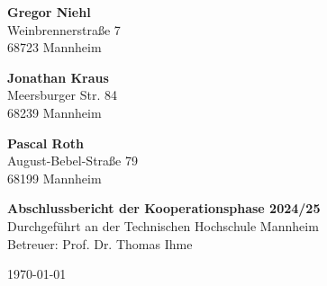 \documentclass[12pt,a4paper]{article}
\begin{document}
\begin{titlepage}
		\vfill
			\begin{minipage}[t]{0.32\textwidth}
			    \raggedright
			    \textbf{Gregor Niehl} \\
			    Weinbrennerstraße 7 \\
			    68723 Mannheim \\
			\end{minipage}
			\hfill
			\begin{minipage}[t]{0.32\textwidth}
			    \centering
			    \textbf{Jonathan Kraus} \\
			    Meersburger Str. 84 \\
			    68239 Mannheim \\
			\end{minipage}
			\hfill
			\begin{minipage}[t]{0.32\textwidth}
			    \raggedleft
			    \textbf{Pascal Roth} \\
			    August-Bebel-Straße 79\\
			    68199 Mannheim \\
			\end{minipage}
		\vfill
		
		\textbf{Abschlussbericht der Kooperationsphase 2024/25} \\
		Durchgeführt an der Technischen Hochschule Mannheim \\
		Betreuer: Prof. Dr. Thomas Ihme \\
		\vfill
		
		\today
	\end{titlepage}
	
	\tableofcontents
	\newpage
	
	
	
	
	
	
	
\end{document}
